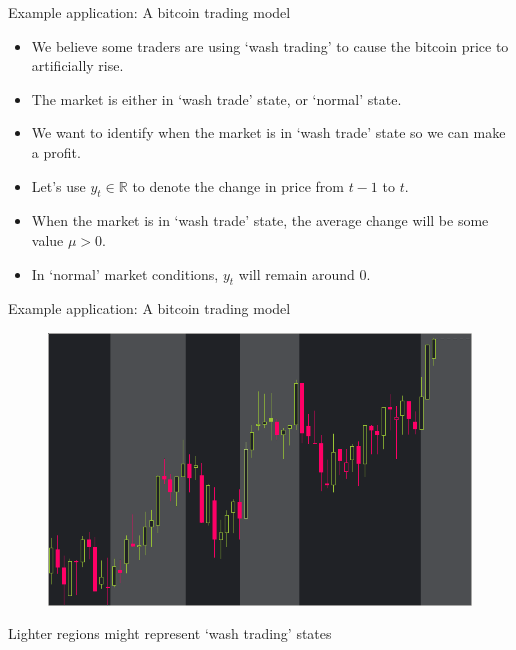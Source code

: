 \documentclass[pdf]
{beamer}
\begin{document}
\begin{frame}{Example application: A bitcoin trading model}
\begin{itemize}
	\item We believe some traders are using `wash trading' to cause the bitcoin price to artificially rise.
	\item The market is either in `wash trade' state, or `normal' state.
	\item We want to identify when the market is in `wash trade' state so we can make a profit.
	\item Let's use $y_t \in \mathbb{R}$ to denote the change in price from $t - 1$ to $t$.
	\item When the market is in `wash trade' state, the average change will be some value $\mu > 0$.
	\item In `normal' market conditions, $y_t$ will remain around $0$.
\end{itemize}
\end{frame}


\begin{frame}{Example application: A bitcoin trading model}
\begin{figure}[htb]
\includegraphics[width=\textwidth]{wash-trading.png}
\end{figure}
\tiny{Lighter regions might represent `wash trading' states}
\end{frame}
\end{document}
